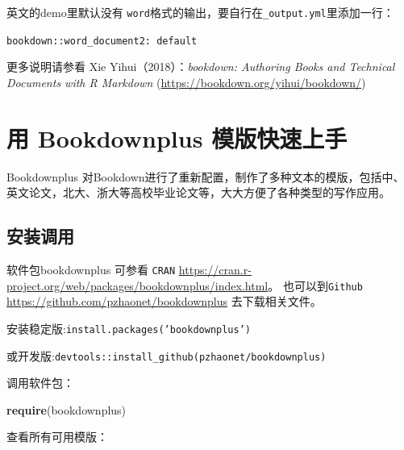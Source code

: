 \documentclass[]{article}
\newenvironment{Shaded}{\begin{snugshade}}{\end{snugshade}}
\newcommand{\KeywordTok}[1]{\textcolor[rgb]{0.13,0.29,0.53}{\textbf{#1}}}
\newcommand{\NormalTok}[1]{#1}
\begin{document}
英文的demo里默认没有
\texttt{word}格式的输出，要自行在\texttt{\_output.yml}里添加一行：

\texttt{bookdown::word\_document2:\ default}

更多说明请参看 Xie Yihui（2018）：\emph{bookdown: Authoring Books and
Technical Documents with R Markdown}
(\url{https://bookdown.org/yihui/bookdown/})

\hypertarget{-bookdownplus-}{%
\section{用 Bookdownplus 模版快速上手}\label{-bookdownplus-}}

Bookdownplus\citep{R-bookdownplus}
对Bookdown进行了重新配置，制作了多种文本的模版，包括中、英文论文，北大、浙大等高校毕业论文等，大大方便了各种类型的写作应用。

\subsection{安装调用}

软件包bookdownplus 可参看 \texttt{CRAN}
\url{https://cran.r-project.org/web/packages/bookdownplus/index.html}。
也可以到\texttt{Github} \url{https://github.com/pzhaonet/bookdownplus}
去下载相关文件。

安装稳定版:\texttt{install.packages(’bookdownplus’)}

或开发版:\texttt{devtools::install\_github(\textquotesingle{}pzhaonet/bookdownplus\textquotesingle{})}

调用软件包：

\begin{Shaded}
\begin{Highlighting}[]
\KeywordTok{require}\NormalTok{(bookdownplus)}
\end{Highlighting}
\end{Shaded}

查看所有可用模版：
\end{document}

